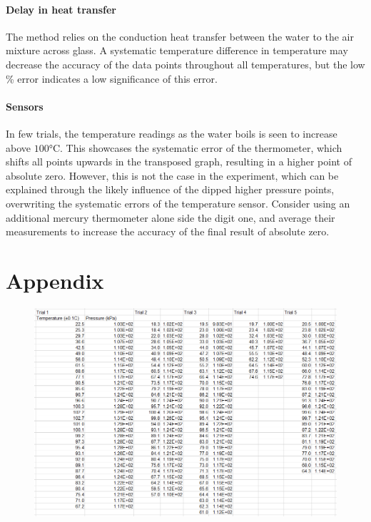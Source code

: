 \documentclass[a4paper,12pt]{article}
\begin{document}
\paragraph{Delay in heat transfer}
The method relies on the conduction heat transfer between the water to the air mixture across glass. A systematic temperature difference in temperature may decrease the accuracy of the data points throughout all temperatures, but the low \% error indicates a low significance of this error.

\paragraph{Sensors}
In few trials, the temperature readings as the water boils is seen to increase above $100\si{\celsius}$. This showcases the systematic error of the thermometer, which shifts all points upwards in the transposed graph, resulting in a higher point of absolute zero. However, this is not the case in the experiment, which can be explained through the likely influence of the dipped higher pressure points, overwriting the systematic errors of the temperature sensor. Consider using an additional mercury thermometer alone side the digit one, and average their measurements to increase the accuracy of the final result of absolute zero.

\newpage
\section*{Appendix}
\appendix
\begin{figure}[H]
    \centering
    \includegraphics[scale=0.55]{assets/unitdata.png}
    \label{fig:pq}
\end{figure}
\end{document}
